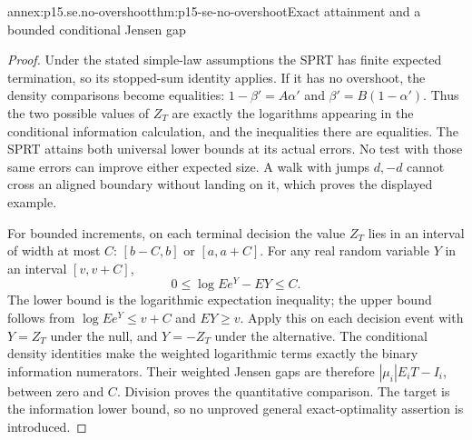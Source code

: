 \begin{annexitem}{annex:p15.se.no-overshoot}{thm:p15-se-no-overshoot}{Exact attainment and a bounded conditional Jensen gap}
\begin{proof}
Under the stated simple-law assumptions the SPRT has finite expected
termination, so its stopped-sum identity applies. If it has no overshoot,
the density comparisons become equalities:
\(1-\beta'=A\alpha'\) and
\(\beta'=B(1-\alpha')\). Thus the two possible values of \(Z_T\)
are exactly the logarithms appearing in the conditional information
calculation, and the inequalities there are equalities. The SPRT attains
both universal lower bounds at its actual errors. No test with those
same errors can improve either expected size. A walk with jumps
\(d,-d\) cannot cross an aligned boundary without landing on it,
which proves the displayed example.

For bounded increments, on each terminal decision the value \(Z_T\)
lies in an interval of width at most \(C\): \([b-C,b]\) or
\([a,a+C]\). For any real random variable \(Y\) in an interval
\([v,v+C]\),
\[
        0\leq\log Ee^Y-EY\leq C.
\]
The lower bound is the logarithmic expectation inequality; the upper
bound follows from \(\log Ee^Y\leq v+C\) and \(EY\geq v\).
Apply this on each decision event with \(Y=Z_T\) under the null,
and \(Y=-Z_T\) under the alternative. The conditional density
identities make the weighted logarithmic terms exactly the binary
information numerators. Their weighted Jensen gaps are therefore
\(|\mu_i|E_iT-I_i\), between zero and \(C\). Division proves
the quantitative comparison. The target is the information lower bound,
so no unproved general exact-optimality assertion is introduced.
\end{proof}
\end{annexitem}
